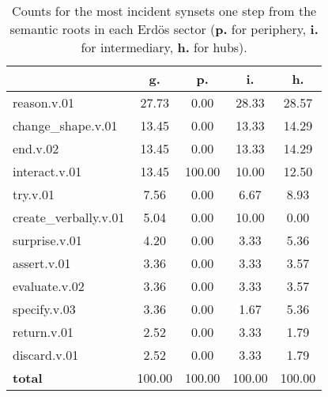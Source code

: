 \begin{table}[h!]
\begin{center}
\begin{tabular}{| l || c | c | c | c |}\hline
 & {\bf g.} & {\bf p.} & {\bf i.} & {\bf h.} \\\hline\hline
reason.v.01 & 27.73  & 0.00  & 28.33  & 28.57 \\\hline
change\_shape.v.01 & 13.45  & 0.00  & 13.33  & 14.29 \\\hline
end.v.02 & 13.45  & 0.00  & 13.33  & 14.29 \\\hline
interact.v.01 & 13.45  & 100.00  & 10.00  & 12.50 \\\hline
try.v.01 & 7.56  & 0.00  & 6.67  & 8.93 \\\hline
create\_verbally.v.01 & 5.04  & 0.00  & 10.00  & 0.00 \\\hline
surprise.v.01 & 4.20  & 0.00  & 3.33  & 5.36 \\\hline
assert.v.01 & 3.36  & 0.00  & 3.33  & 3.57 \\\hline
evaluate.v.02 & 3.36  & 0.00  & 3.33  & 3.57 \\\hline
specify.v.03 & 3.36  & 0.00  & 1.67  & 5.36 \\\hline
return.v.01 & 2.52  & 0.00  & 3.33  & 1.79 \\\hline
discard.v.01 & 2.52  & 0.00  & 3.33  & 1.79 \\\hline\hline
{{\bf total}} & 100.00  & 100.00  & 100.00  & 100.00 \\\hline
\end{tabular}
\caption{Counts for the most incident synsets one step from the semantic roots in each Erd\"os sector ({\bf p.} for periphery, {\bf i.} for intermediary, {\bf h.} for hubs).}
\end{center}
\end{table}
